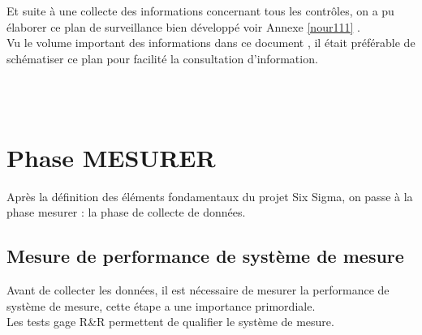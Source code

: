 \documentclass[12pt, a4paper]{thesis}
\begin{document}
Et suite à une collecte des informations concernant tous les contrôles, on a pu élaborer ce plan de surveillance bien développé voir Annexe \ref{nour111} .\\
Vu le volume important des informations dans ce document , il était préférable de schématiser ce plan pour facilité la consultation d'information.

\begin{center}
 \\
  \\
 

 \end{center}






\section{Phase MESURER}
Après la définition des éléments fondamentaux du projet Six Sigma, on passe à la phase mesurer : la phase de collecte de données.
\subsection{Mesure de performance de système de mesure}
Avant de collecter les données, il est nécessaire de mesurer la performance de système de mesure, cette étape a une importance primordiale.\\
Les tests gage R\&R permettent de qualifier le système de mesure.
\end{document}
